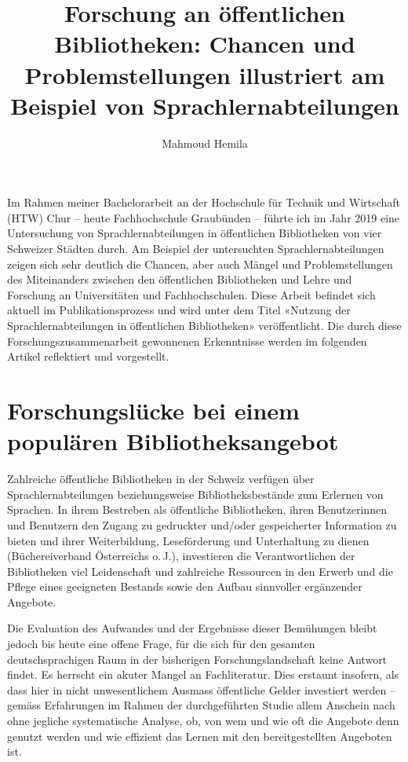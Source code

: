 \documentclass[a4paper,
fontsize=11pt,
oneside,
numbers=noperiodatend,
parskip=half-,
bibliography=totoc,
final
]{scrartcl}
\title{\LARGE{Forschung an öffentlichen Bibliotheken: Chancen und Problemstellungen illustriert am Beispiel von Sprachlernabteilungen}}%
\author{Mahmoud Hemila} %
\date{}
\begin{document}
\maketitle
\thispagestyle{fancyplain} 


Im Rahmen meiner Bachelorarbeit an der Hochschule für Technik und
Wirtschaft (HTW) Chur -- heute Fachhochschule Graubünden -- führte ich
im Jahr 2019 eine Untersuchung von Sprachlernabteilungen in öffentlichen
Bibliotheken von vier Schweizer Städten durch. Am Beispiel der
untersuchten Sprachlernabteilungen zeigen sich sehr deutlich die
Chancen, aber auch Mängel und Problemstellungen des Miteinanders
zwischen den öffentlichen Bibliotheken und Lehre und Forschung an
Universitäten und Fachhochschulen. Diese Arbeit befindet sich aktuell im
Publikationsprozess und wird unter dem Titel «Nutzung der
Sprachlernabteilungen in öffentlichen Bibliotheken» veröffentlicht. Die
durch diese Forschungszusammenarbeit gewonnenen Erkenntnisse werden im
folgenden Artikel reflektiert und vorgestellt.

\hypertarget{forschungsluxfccke-bei-einem-populuxe4ren-bibliotheksangebot}{%
\section{Forschungslücke bei einem populären
Bibliotheksangebot}\label{forschungsluxfccke-bei-einem-populuxe4ren-bibliotheksangebot}}

Zahlreiche öffentliche Bibliotheken in der Schweiz verfügen über
Sprachlernabteilungen beziehungsweise Bibliotheksbestände zum Erlernen
von Sprachen. In ihrem Bestreben als öffentliche Bibliotheken, ihren
Benutzerinnen und Benutzern den Zugang zu gedruckter und/oder
gespeicherter Information zu bieten und ihrer Weiterbildung,
Leseförderung und Unterhaltung zu dienen (Büchereiverband Österreichs
o.\,J.), investieren die Verantwortlichen der Bibliotheken viel
Leidenschaft und zahlreiche Ressourcen in den Erwerb und die Pflege
eines geeigneten Bestands sowie den Aufbau sinnvoller ergänzender
Angebote.

Die Evaluation des Aufwandes und der Ergebnisse dieser Bemühungen bleibt
jedoch bis heute eine offene Frage, für die sich für den gesamten
deutschsprachigen Raum in der bisherigen Forschungslandschaft keine
Antwort findet. Es herrscht ein akuter Mangel an Fachliteratur. Dies
erstaunt insofern, als dass hier in nicht unwesentlichem Ausmass
öffentliche Gelder investiert werden -- gemäss Erfahrungen im Rahmen der
durchgeführten Studie allem Anschein nach ohne jegliche systematische
Analyse, ob, von wem und wie oft die Angebote denn genutzt werden und
wie effizient das Lernen mit den bereitgestellten Angeboten ist.
\end{document}
